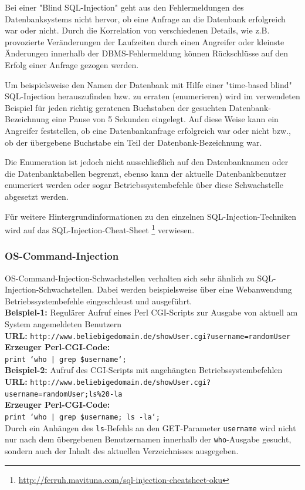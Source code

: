 
Bei einer "Blind SQL-Injection" geht aus den Fehlermeldungen des 
Datenbanksystems nicht hervor, ob eine Anfrage an die Datenbank 
erfolgreich war oder nicht. Durch die Korrelation von verschiedenen 
Details, wie z.B. provozierte Veränderungen der Laufzeiten durch 
einen Angreifer oder kleinste Änderungen innerhalb der 
DBMS-Fehlermeldung können Rückschlüsse auf den Erfolg einer Anfrage 
gezogen werden.
 
Um beispielsweise den Namen der Datenbank mit Hilfe einer 
"time-based blind" SQL-Injection herauszufinden bzw. zu erraten 
(enumerieren) wird im verwendeten Beispiel für jeden richtig geratenen 
Buchstaben der gesuchten Datenbank-Bezeichnung eine Pause von 5 Sekunden 
eingelegt. Auf diese Weise kann ein Angreifer feststellen, ob eine 
Datenbankanfrage erfolgreich war oder nicht bzw., ob der übergebene 
Buchstabe ein Teil der Datenbank-Bezeichnung war. 

Die Enumeration ist jedoch nicht ausschließlich auf den Datenbanknamen 
oder die Datenbanktabellen begrenzt, ebenso kann der aktuelle 
Datenbankbenutzer enumeriert werden oder sogar Betriebssystembefehle 
über diese Schwachstelle abgesetzt werden.

Für weitere Hintergrundinformationen zu den einzelnen 
SQL-Injection-Techniken wird auf das SQL-Injection-Cheat-Sheet
\footnote{\url{http://ferruh.mavituna.com/sql-injection-cheatsheet-oku}} 
verwiesen.

\subsubsection{OS-Command-Injection}

OS-Command-Injection-Schwachstellen verhalten sich sehr ähnlich zu 
SQL-Injection-Schwachstellen. Dabei werden beispielsweise über eine 
Webanwendung Betriebssystembefehle eingeschleust und ausgeführt.
\\
\textbf{Beispiel-1:} Regulärer Aufruf eines Perl CGI-Scripts zur Ausgabe von aktuell am System angemeldeten Benutzern
\\
\textbf{URL:} \texttt{http://www.beliebigedomain.de/showUser.cgi?username=randomUser}
\\
\textbf{Erzeuger Perl-CGI-Code:}
\\
\texttt{\footnotesize{print `who | grep \$username`;}}
\\
\textbf{Beispiel-2:} Aufruf des CGI-Scripts mit angehängten Betriebssystembefehlen
\\
\textbf{URL:} \texttt{http://www.beliebigedomain.de/showUser.cgi?\\username=randomUser;ls\%20-la}
\\
\textbf{Erzeuger Perl-CGI-Code:}
\\
\texttt{\footnotesize{print `who | grep \$username; ls -la`;}}
\\
Durch ein Anhängen des \texttt{ls}-Befehls an den GET-Parameter 
\texttt{username} wird nicht nur nach dem übergebenen Benutzernamen 
innerhalb der \texttt{who}-Ausgabe gesucht, sondern auch der Inhalt 
des aktuellen Verzeichnisses ausgegeben.

